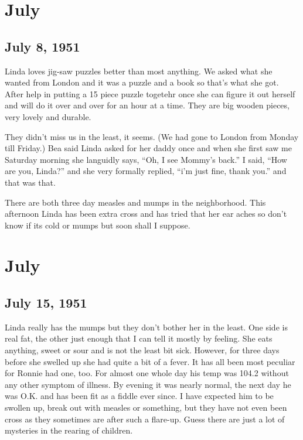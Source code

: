 \documentclass[
]{book}
\begin{document}
\hypertarget{july-1}{%
\section{July}\label{july-1}}

\hypertarget{july-8-1951}{%
\subsection{July 8, 1951}\label{july-8-1951}}

Linda loves jig-saw puzzles better than most anything. We asked what she wanted from London and it was a puzzle and a book so that's what she got. After help in putting a 15 piece puzzle togetehr once she can figure it out herself and will do it over and over for an hour at a time. They are big wooden pieces, very lovely and durable.

They didn't miss us in the least, it seems. (We had gone to London from Monday till Friday.) Bea said Linda asked for her daddy once and when she first saw me Saturday morning she languidly says, ``Oh, I see Mommy's back.'' I said, ``How are you, Linda?'' and she very formally replied, ``i'm just fine, thank you.'' and that was that.

There are both three day measles and mumps in the neighborhood. This afternoon Linda has been extra cross and has tried that her ear aches so don't know if its cold or mumps but soon shall I suppose.

\hypertarget{july-2}{%
\section{July}\label{july-2}}

\hypertarget{july-15-1951}{%
\subsection{July 15, 1951}\label{july-15-1951}}

Linda really has the mumps but they don't bother her in the least. One side is real fat, the other just enough that I can tell it mostly by feeling. She eats anything, sweet or sour and is not the least bit sick. However, for three days before she swelled up she had quite a bit of a fever. It has all been most peculiar for Ronnie had one, too. For almost one whole day his temp was 104.2 without any other symptom of illness. By evening it was nearly normal, the next day he was O.K. and has been fit as a fiddle ever since. I have expected him to be swollen up, break out with measles or something, but they have not even been cross as they sometimes are after such a flare-up. Guess there are just a lot of mysteries in the rearing of children.
\end{document}
